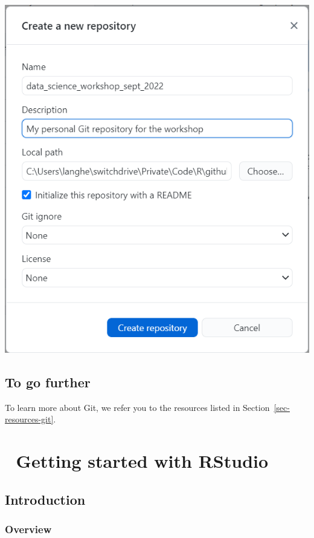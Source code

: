 \documentclass[
  letterpaper,
  DIV=11,
  numbers=noendperiod,
  oneside]{scrreprt}
\begin{document}
\includegraphics{images/paste-D831B36F.png}

\hypertarget{to-go-further}{%
\section{To go further}\label{to-go-further}}

To learn more about Git, we refer you to the resources listed in
Section~\ref{sec-resources-git}.

\hypertarget{getting-started-with-rstudio}{%
\chapter{\texorpdfstring{{📘} Getting started with
RStudio}{📘 Getting started with RStudio}}\label{getting-started-with-rstudio}}

\hypertarget{introduction-4}{%
\section{Introduction}\label{introduction-4}}

\hypertarget{overview-2}{%
\subsection{Overview}\label{overview-2}}
\end{document}
